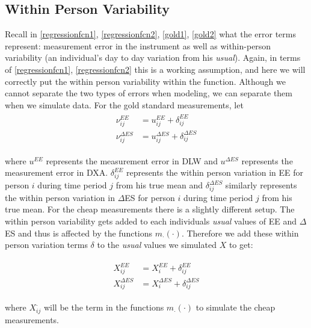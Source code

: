 \documentclass[11pt]{article}\usepackage[]{graphicx}\usepackage[]{color}
\begin{document}
\subsection{Within Person Variability}

Recall in \eqref{regressionfcn1}, \eqref{regressionfcn2}, \eqref{gold1}, \eqref{gold2} what the error terms represent: measurement error in the instrument as well as within-person variability (an individual's day to day variation from his \emph{usual}). Again, in terms of \eqref{regressionfcn1}, \eqref{regressionfcn2} this is a working assumption, and here we will correctly put the within person variability within the function. Although we cannot separate the two types of errors when modeling, we can separate them when we simulate data. For the gold standard measurements, let 
\begin{align}
\begin{split}
\label{wpw}
\nu_{ij}^{EE} &= u_{ij}^{EE} + \delta_{ij}^{EE} \\
\nu_{ij}^{\Delta ES} &= u_{ij}^{\Delta ES} + \delta_{ij}^{\Delta ES}
\end{split}
\end{align}

where $u^{EE}$ represents the measurement error in DLW and $u^{\Delta ES}$ represents the measurement error in DXA. $\delta_{ij}^{EE}$ represents the within person variation in EE for person $i$ during time period $j$ from his true mean and  $\delta_{ij}^{\Delta ES}$ similarly represents the within person variation in $\Delta$ES for person $i$ during time period $j$ from his true mean. For the cheap measurements there is a slightly different setup. The within person variability gets added to each individuals \emph{usual} values of EE and $\Delta$ES and thus is affected by the functions $m_{\cdot}(\cdot)$. Therefore we add these within person variation terms $\delta$ to the \emph{usual} values we simulated $X$ to get:

\begin{align}
\begin{split}
\label{wpy}
X_{ij}^{EE} &= X_{i}^{EE} + \delta_{ij}^{EE} \\
X_{ij}^{\Delta ES} &= X_{i}^{\Delta ES} + \delta_{ij}^{\Delta ES}
\end{split}
\end{align} 

where $X_{ij}^{\cdot}$ will be the term in the functions $m_{\cdot}(\cdot)$ to simulate the cheap measurements.
\end{document}
